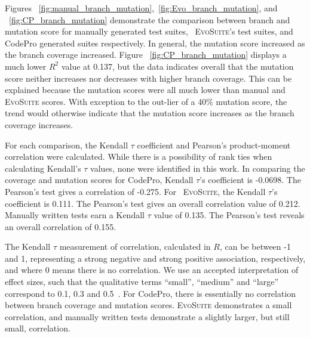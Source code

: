 Figures ~\ref{fig:manual_branch_mutation},~\ref{fig:Evo_branch_mutation}, and ~\ref{fig:CP_branch_mutation} demonstrate the comparison between branch and mutation score for manually generated test suites, ~\textsc{EvoSuite}'s test suites, and CodePro generated suites respectively.  In general, the mutation score increased as the branch coverage increased.  Figure ~\ref{fig:CP_branch_mutation} displays a much lower $R^2$ value at 0.137, but the data indicates overall that the mutation score neither increases nor decreases with higher branch coverage. This can be explained because the mutation scores were all much lower than manual and  \textsc{EvoSuite} scores. With exception to the out-lier of a 40\% mutation score, the trend would otherwise indicate that the mutation score increases as the branch coverage increases.

  For each comparison, the Kendall $\tau$ coefficient and Pearson's product-moment correlation were calculated.  While there is a possibility of rank ties when calculating Kendall's $\tau$ values, none were identified in this work.  In comparing the coverage and mutation scores for CodePro, Kendall $\tau$'s coefficient is -0.0698.  The Pearson's test gives a correlation of -0.275. 
For ~\textsc{EvoSuite}, the Kendall $\tau$'s coefficient is 0.111.  The Pearson's test gives an overall correlation value of 0.212.  
Manually written tests earn a Kendall $\tau$ value of 0.135.  The Pearson's test reveals an overall correlation of 0.155.  

The Kendall $\tau$ measurement of correlation, calculated in $R$, can be between -1 and 1, representing a strong negative and strong positive association, respectively, and where 0 means there is no correlation. We use an accepted interpretation of effect sizes, such that the qualitative terms ``small'', ``medium'' and ``large'' correspond to 0.1, 0.3 and 0.5~\cite{kraemer2003}.  For CodePro, there is essentially no correlation between branch coverage and mutation scores.  \textsc{EvoSuite} demonstrates a small correlation, and manually written tests demonstrate a slightly larger, but still small, correlation. 


